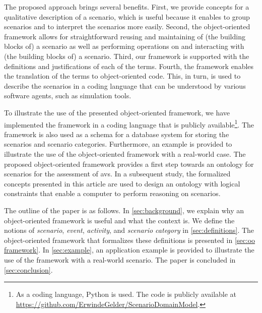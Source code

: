 The proposed approach brings several benefits.
First, we provide concepts for a qualitative description of a scenario, which is useful because it enables to group scenarios and to interpret the scenarios more easily. 
Second, the object-oriented framework allows for straightforward reusing and maintaining of (the building blocks of) a scenario as well as performing operations on and interacting with (the building blocks of) a scenario.
Third, our framework is supported with the definitions and justifications of each of the terms.
Fourth, the framework enables the translation of the terms to object-oriented code.
This, in turn, is used to describe the scenarios in a coding language that can be understood by various software agents, such as simulation tools. 

To illustrate the use of the presented object-oriented framework, we have implemented the framework in a coding language that is publicly available\footnote{As a coding language, Python is used. The code is publicly available at \url{https://github.com/ErwindeGelder/ScenarioDomainModel}.}.
The framework is also used as a schema for a database system for storing the scenarios and scenario categories.
Furthermore, an example is provided to illustrate the use of the object-oriented framework with a real-world case.
The proposed object-oriented framework provides a first step towards an ontology \autocite{siricharoen2009ontology} for scenarios for the assessment of \acp{av}. In a subsequent study, the formalized concepts presented in this article are used to design an ontology with logical constraints that enable a computer to perform reasoning on scenarios.
\cendc

The outline of the paper is as follows. In \cref{sec:background}, we explain why an \cstartb object-oriented framework \cendb is useful and what the context is. 
We define the notions of \emph{scenario}, \emph{event}, \emph{activity}, and \emph{scenario category}  in \cref{sec:definitions}. 
The \cstartb object-oriented framework \cendb that formalizes these definitions is presented in \cref{sec:oo framework}. 
In \cref{sec:example}, an application example is provided to illustrate the use of the \cstartb framework \cendb with a real-world scenario. 
The paper is concluded in \cref{sec:conclusion}.
